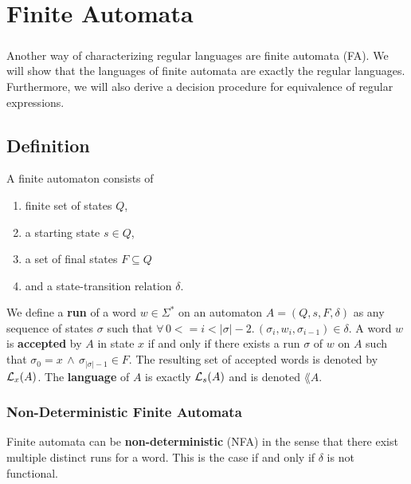 
\chapter{Finite Automata}
\paragraph{} 
Another way of characterizing regular languages are finite automata (FA). 
We will show that the languages of finite automata are exactly the regular languages. 
Furthermore, we will also derive a decision procedure for equivalence of regular expressions.

\section{Definition}
A finite automaton consists of
\begin{enumerate}
    \item
        finite set of states $Q$, 
    \item 
        a starting state $s \in Q$, 
    \item 
        a set of final states $F \subseteq Q$ 
    \item 
        and a state-transition relation $\delta$. \cite{DBLP:books/daglib/0011126}
\end{enumerate}

We define a \textbf{run} of a word $w \in \Sigma^*$ on an automaton $A = (Q, s, F, \delta)$ as any sequence of states $\sigma$ such that 
$\forall \, 0 <= i < \vert\sigma\vert-2. \, (\sigma_i, w_i, \sigma_{i-1}) \in \delta$.
A word $w$ is \textbf{accepted} by $A$ in state $x$ if and only if there exists a run $\sigma$ of $w$ on $A$ such that $\sigma_0 = x \, \wedge \, \sigma_{\vert\sigma\vert-1} \in F$.
The resulting set of accepted words is denoted by $\mathcal{L}_{x}(A)$.
The \textbf{language} of $A$ is exactly $\mathcal{L}_{s}(A)$ and is denoted $\lang{A}$. 

\subsection{Non-Deterministic Finite Automata}
Finite automata can be \textbf{non-deterministic} (NFA) in the sense that there exist multiple distinct runs for a word. 
This is the case if and only if $\delta$ is not functional.


